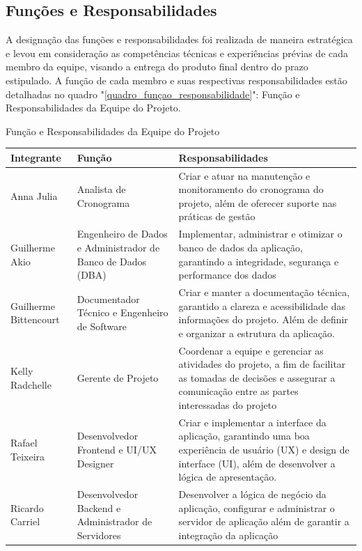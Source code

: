 \documentclass[
	12pt,				%
	openany,			%
	twoside,			%
	a4paper,			%
	english,			%
	french,				%
	spanish,			%
	brazil				%
	]{abntex2}
\begin{document}
\subsection{Funções e Responsabilidades}
A designação das funções e responsabilidades foi realizada de maneira estratégica e levou em consideração as competências técnicas e experiências prévias de cada membro da equipe, visando a entrega do produto final dentro do prazo estipulado. 	A função de cada membro e suas respectivas responsabilidades estão detalhadas no quadro "\ref{quadro_funçao_responsabilidade}": Função e Responsabilidades da Equipe do Projeto.	

\begin{quadro}[htb]
	\caption{Função e Responsabilidades da Equipe do Projeto}
	\label{quadro_funçao_responsabilidade}
	\begin{tabular}{|p{2.8cm}|p{5cm}|p{7.2cm}|}
		\hline
		\textbf{Integrante} & \textbf{Função} & \textbf{Responsabilidades} \\ \hline
		Anna Julia & Analista de Cronograma & Criar e atuar na manutenção e monitoramento do cronograma do projeto, além de oferecer suporte nas práticas de gestão  \\ \hline
	
		Guilherme Akio & Engenheiro de Dados e Administrador de Banco de Dados (DBA) & Implementar, administrar  e otimizar o banco de dados da aplicação, garantindo a integridade, segurança e performance dos dados \\ \hline
	
		Guilherme \quad Bittencourt & Documentador Técnico e Engenheiro de Software & Criar e manter a documentação técnica, garantido a clareza e acessibilidade das informações do projeto. Além de definir e organizar a estrutura da aplicação.\\ \hline
	
		Kelly Radchelle & Gerente de Projeto & Coordenar a equipe e gerenciar as atividades  do projeto, a fim de facilitar as tomadas de decisões e  assegurar a comunicação entre as partes interessadas do projeto   \\ \hline
		Rafael Teixeira & Desenvolvedor Frontend e UI/UX Designer & Criar e implementar a interface da aplicação, garantindo uma boa  experiência de usuário (UX)  e design de interface (UI), além de desenvolver a lógica de apresentação.    \\ \hline
		Ricardo Carriel & Desenvolvedor Backend e Administrador de Servidores & Desenvolver a lógica de negócio da aplicação, configurar e administrar o servidor de aplicação  além de garantir a integração da aplicação  \\ \hline
	\end{tabular}
\end{quadro}
\end{document}
